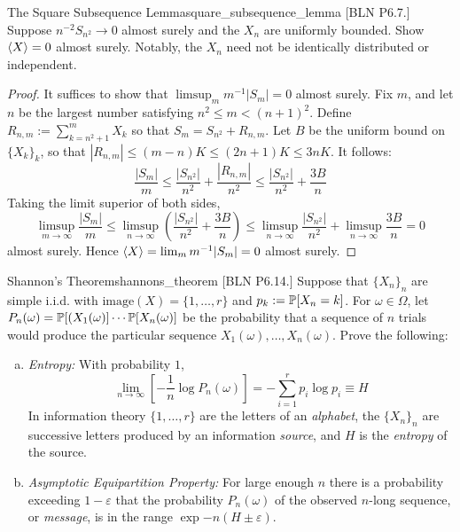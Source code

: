 \begin{problem}{The Square Subsequence Lemma}{square_subsequence_lemma}
    [BLN P6.7.] Suppose \(n^{-2} S_{n^2} \to 0\) almost surely and the \(X_n\) are uniformly bounded. Show \(\ev{X} = 0\) almost surely. Notably, the \(X_n\) need not be identically distributed or independent. 
\end{problem}

\begin{proof}
    It suffices to show that \(\limsup_m m^{-1} |S_m| = 0\) almost surely. Fix \(m\), and let \(n\) be the largest number satisfying \(n^2 \leq m < (n+1)^2\). Define \(R_{n,m} := \sum_{k=n^2+1}^m X_k\) so that \(S_m = S_{n^2} + R_{n,m}\). Let \(B\) be the uniform bound on \(\{X_k\}_k\), so that \(|R_{n,m}| \leq (m-n) K \leq (2n+1) K \leq 3nK\). It follows: 
    \[
        \frac{|S_m|}{m} \leq \frac{|S_{n^2}|}{n^2} + \frac{|R_{n,m}|}{n^2} \leq \frac{|S_{n^2}|}{n^2} + \frac{3B}{n}
    \]
    Taking the limit superior of both sides, 
    \[
        \limsup_{m \to \infty} \frac{|S_m|}{m} 
        \leq \limsup_{n \to \infty} \left( \frac{|S_{n^2}|}{n^2} + \frac{3B}{n} \right)
        \leq \limsup_{n \to \infty} \frac{|S_{n^2}|}{n^2} + \limsup_{n \to \infty} \frac{3B}{n}
        = 0
    \]
    almost surely. Hence \(\ev{X} = \lim_m m^{-1} |S_m| = 0\) almost surely. 
\end{proof}



\begin{problem}{Shannon's Theorem}{shannons_theorem}
    [BLN P6.14.] Suppose that \(\{X_n\}_n\) are simple i.i.d. with \(\text{image}(X) = \{1, \dots, r\}\) and \(p_k := \mathbb{P}[X_n = k]\). For \(\omega \in \Omega\), let \(P_n(\omega) = \mathbb{P}[(X_1(\omega)] \cdots \mathbb{P}[X_n(\omega)]\) be the probability that a sequence of \(n\) trials would produce the particular sequence \(X_1(\omega), \dots, X_n(\omega)\). Prove the following: 
    \begin{enumerate}[(a)]
        \itemsep0em
        \item \textit{Entropy:} With probability \(1\), 
        \[
            \lim_{n \to \infty} \left[ - \frac{1}{n} \log P_n(\omega) \right] 
            = - \sum_{i=1}^r p_i \log p_i 
            \equiv H
        \]
        In information theory \(\{1, \dots, r\}\) are the letters of an \textit{alphabet}, the \(\{X_n\}_n\) are successive letters produced by an information \textit{source}, and \(H\) is the \textit{entropy} of the source. 
        \item \textit{Asymptotic Equipartition Property:} For large enough \(n\) there is a probability exceeding \(1 - \varepsilon\) that the probability \(P_n(\omega)\) of the observed \(n\)-long sequence, or \textit{message}, is in the range \(\exp{-n(H \pm \varepsilon)}\).
    \end{enumerate}
\end{problem}

